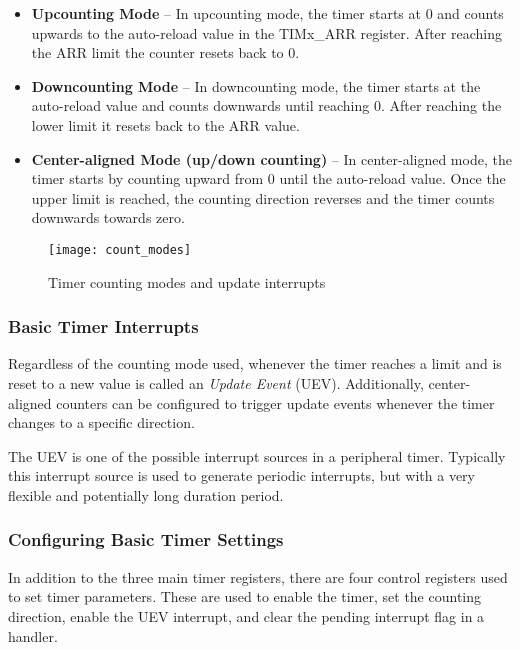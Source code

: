 \documentclass[11pt,fleqn]{book} %
\begin{document}
    \begin{itemize}
        \item \textbf{Upcounting Mode} --  In upcounting mode, the timer starts at 0 and counts upwards to the auto-reload value in the TIMx\_ARR register. After reaching the ARR limit the counter resets back to 0. 
        \item \textbf{Downcounting Mode} -- In downcounting mode, the timer starts at the auto-reload value and counts downwards until reaching 0. After reaching the lower limit it resets back to the ARR value.
        \item \textbf{Center-aligned Mode (up/down counting)} -- In center-aligned mode, the timer starts by counting upward from 0 until the auto-reload value. Once the upper limit is reached, the counting direction reverses and the timer counts downwards towards zero.
    \end{itemize}

    \begin{figure}[]
        \centering\texttt{[image: count\_modes]}
        \caption{Timer counting modes and update interrupts}
        \label{count_modes}
    \end{figure}
    
    \subsubsection{Basic Timer Interrupts}
    
    Regardless of the counting mode used, whenever the timer reaches a limit and is reset to a new value is called an \textit{Update Event} (UEV). Additionally, center-aligned counters can be configured to trigger update events whenever the timer changes to a specific direction. 
    
    The UEV is one of the possible interrupt sources in a peripheral timer. Typically this interrupt source is used to generate periodic interrupts, but with a very flexible and potentially long duration period. 
    
    
    \subsubsection{Configuring Basic Timer Settings}
    In addition to the three main timer registers, there are four control registers used to set timer parameters. These are used to enable the timer, set the counting direction, enable the UEV interrupt, and clear the pending interrupt flag in a handler. 
    
\end{document}
